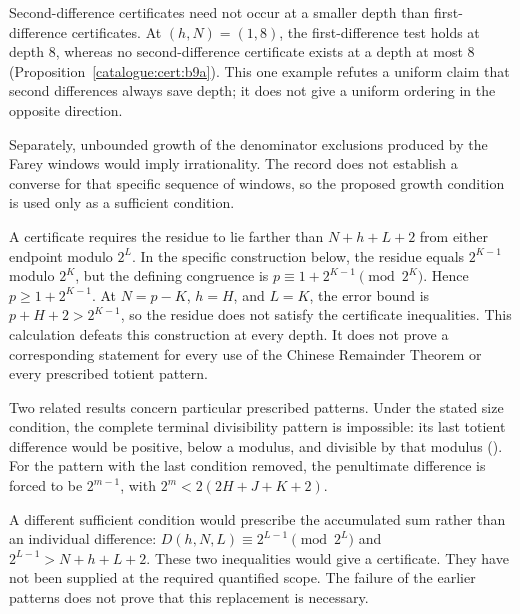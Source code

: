 \begin{rem}
Second-difference certificates need not occur at a smaller depth than
first-difference certificates. At $(h,N)=(1,8)$, the first-difference test
holds at depth $8$, whereas no second-difference certificate exists at a
depth at most $8$ (Proposition~\ref{catalogue:cert:b9a}). This one
example refutes a uniform claim that second differences always save depth;
it does not give a uniform ordering in the opposite direction.

Separately, unbounded growth of the denominator exclusions produced by the
Farey windows would imply irrationality. The record does not establish a
converse for that specific sequence of windows, so the proposed growth
condition is used only as a sufficient condition.
\end{rem}

\begin{prop}
\label{prop:b4}
A certificate requires the residue to lie farther than $N+h+L+2$
from either endpoint modulo $2^L$. In the specific construction below,
the residue equals $2^{K-1}$ modulo $2^K$, but the defining
congruence is $p\equiv1+2^{K-1}\pmod{2^K}$. Hence
$p\ge1+2^{K-1}$. At $N=p-K$, $h=H$, and $L=K$, the error bound is
$p+H+2>2^{K-1}$, so the residue does not satisfy the certificate inequalities.
This calculation defeats this construction at every depth. It does not
prove a corresponding statement for every use of the Chinese Remainder
Theorem or every prescribed totient pattern.
\end{prop}

\begin{rem}
\label{rem:b4}
Two related results concern particular prescribed patterns. Under the
stated size condition, the complete terminal divisibility pattern is
impossible: its last totient difference would be positive, below a modulus,
and divisible by that modulus
().
For the pattern with the last condition
removed, the penultimate difference is forced to be $2^{m-1}$, with
$2^m<2(2H+J+K+2)$.

A different sufficient condition would prescribe the accumulated sum
rather than an individual difference:
${D}(h,N,L)\equiv2^{L-1}\pmod{2^L}$ and
$2^{L-1}>N+h+L+2$. These two inequalities would give a certificate.
They have not been supplied at the required quantified scope. The failure
of the earlier patterns does not prove that this replacement is necessary.
\end{rem}

